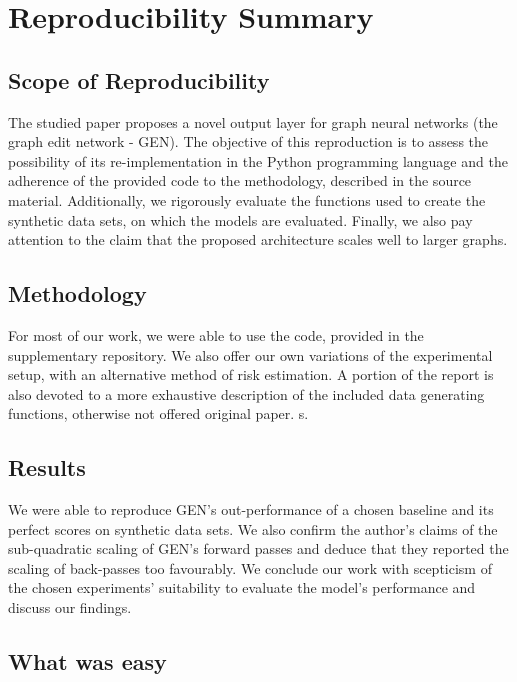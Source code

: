 \section{Reproducibility Summary}

\subsection*{Scope of Reproducibility}

The studied paper proposes a novel output layer for graph neural networks (the graph edit network - GEN). The objective of this reproduction is to assess the possibility of its re-implementation in the Python programming language and the adherence of the provided code to the methodology, described in the source material. Additionally, we rigorously evaluate the functions used to create the synthetic data sets, on which the models are evaluated. Finally, we also pay attention to the claim that the proposed architecture scales well to larger graphs.  


\subsection*{Methodology}


For most of our work, we were able to use the code, provided in the supplementary repository. We also offer our own variations of the experimental setup, with an alternative method of risk estimation. A portion of the report is also devoted to a more exhaustive description of the included data generating functions, otherwise not offered original paper.
s. 

\subsection*{Results}

We were able to reproduce GEN's out-performance of a chosen baseline and its perfect scores on synthetic data sets. We also confirm the author's claims of the sub-quadratic scaling of GEN's forward passes and deduce that they reported the scaling of back-passes too favourably. We conclude our work with scepticism of the chosen experiments' suitability to evaluate the model's performance and discuss our findings.


\subsection*{What was easy}



